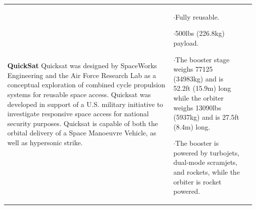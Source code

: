 {\begin{landscape}
\begin{xltabular}{\linewidth}{|X|X|X|}
	\\
	\hline \small 
	\textbf{QuickSat}\cite{Eklund2012}\newline\newline
Quicksat was designed by SpaceWorks Engineering and the Air Force Research Lab as a conceptual exploration of combined cycle propulsion systems for reusable space access. Quicksat was developed in support of a U.S. military initiative to investigate responsive space access for national security purposes. Quicksat is capable of both the orbital delivery of a Space Manoeuvre Vehicle, as well as hypersonic strike. 
	&\small
	
	$\cdot$Fully reusable. 
	
	$\cdot$500lbs (226.8kg) payload. 
	
	$\cdot$The booster stage weighs 77125 (34983kg) and is 52.2ft (15.9m) long while the orbiter weighs 13090lbs (5937kg) and is 27.5ft (8.4m) long.
	
	$\cdot$The booster is powered by turbojets, dual-mode scramjets, and rockets, while the orbiter is rocket powered.
	
	&\small
	

\end{xltabular}
\end{landscape}}
